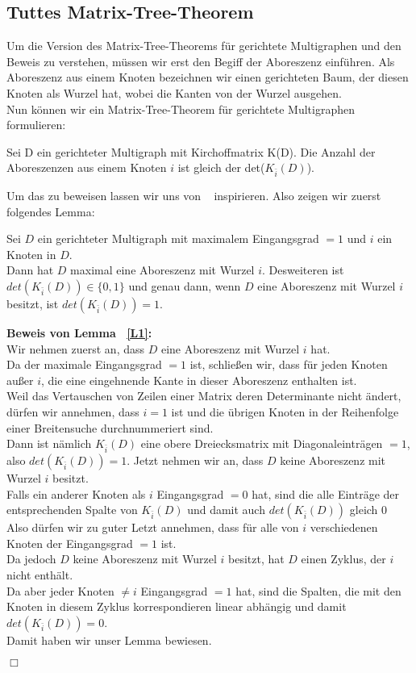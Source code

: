 \subsection{Tuttes Matrix-Tree-Theorem}
Um die Version des Matrix-Tree-Theorems für gerichtete Multigraphen und den Beweis zu verstehen, müssen wir erst den Begiff der Aboreszenz einführen.
Als Aboreszenz aus einem Knoten bezeichnen wir einen gerichteten Baum, der diesen Knoten als Wurzel hat, wobei die Kanten von der Wurzel ausgehen.\\
Nun können wir ein Matrix-Tree-Theorem für gerichtete Multigraphen formulieren:
\begin{Tms}
Sei D ein gerichteter Multigraph mit Kirchoffmatrix K(D). Die Anzahl der Aboreszenzen aus einem Knoten $i$ ist gleich der det($K_{\bar{i}}(D)$).
\end{Tms}
Um das zu beweisen lassen wir uns von ~\cite{bang-jensen_2009} inspirieren.
Also zeigen wir zuerst folgendes Lemma:
\begin{Lms}
Sei $D$ ein gerichteter Multigraph mit maximalem Eingangsgrad $=1$ und $i$ ein Knoten in $D$.\\
Dann hat $D$ maximal eine Aboreszenz mit Wurzel $i$. Desweiteren ist $det(K_{\bar{i}}(D)) \in \{0,1\}$
und genau dann, wenn $D$ eine Aboreszenz mit Wurzel $i$ besitzt, ist $det(K_{\bar{i}}(D)) = 1$.
\label{L1}
\end{Lms}
\textbf{Beweis von Lemma ~\ref{L1}:}\\
Wir nehmen zuerst an, dass $D$ eine Aboreszenz mit Wurzel $i$ hat.\\
Da der maximale Eingangsgrad $=1$ ist, schließen wir, dass für jeden Knoten außer $i$, die eine eingehnende Kante in dieser Aboreszenz enthalten ist. \\
Weil das Vertauschen von Zeilen einer Matrix deren Determinante nicht ändert, dürfen wir annehmen, dass $i=1$ ist und die übrigen Knoten in der Reihenfolge einer Breitensuche durchnummeriert sind.\\ 
Dann ist nämlich $K_{\bar{i}}(D)$ eine obere Dreiecksmatrix mit Diagonaleinträgen $=1$, also $det(K_{\bar{i}}(D)) = 1$.
Jetzt nehmen wir an, dass $D$ keine Aboreszenz mit Wurzel $i$ besitzt.\\
Falls ein anderer Knoten als $i$ Eingangsgrad $=0$ hat, sind die alle Einträge der entsprechenden Spalte von $K_{\bar{i}}(D)$ und damit auch $det(K_{\bar{i}}(D))$ gleich $0$\\
Also dürfen wir zu guter Letzt annehmen, dass für alle von $i$ verschiedenen Knoten der Eingangsgrad $=1$ ist.\\
Da jedoch $D$ keine Aboreszenz mit Wurzel $i$ besitzt, hat $D$ einen Zyklus, der $i$ nicht enthält.\\
Da aber jeder Knoten $\neq i$ Eingangsgrad $=1$ hat, sind die Spalten, die mit den Knoten in diesem Zyklus korrespondieren linear abhängig und damit $det(K_{\bar{i}}(D)) = 0$.\\
Damit haben wir unser Lemma bewiesen.
\begin{flushright} $\Box$ \end{flushright} 

